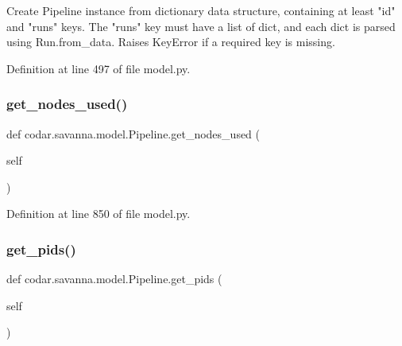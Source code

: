 \begin{DoxyVerb}Create Pipeline instance from dictionary data structure, containing
at least "id" and "runs" keys. The "runs" key must have a list of dict,
and each dict is parsed using Run.from_data.
Raises KeyError if a required key is missing.\end{DoxyVerb}
 

Definition at line 497 of file model.\+py.

\mbox{\label{classcodar_1_1savanna_1_1model_1_1_pipeline_a0c85356d538d06651c7ed18ceb7c1ce5}} 
\subsubsection{\texorpdfstring{get\+\_\+nodes\+\_\+used()}{get\_nodes\_used()}}
{\footnotesize\ttfamily def codar.\+savanna.\+model.\+Pipeline.\+get\+\_\+nodes\+\_\+used (\begin{DoxyParamCaption}\item[{}]{self }\end{DoxyParamCaption})}



Definition at line 850 of file model.\+py.

\mbox{\label{classcodar_1_1savanna_1_1model_1_1_pipeline_a45f720376f4a44a4d87777c572c7dd3c}} 
\subsubsection{\texorpdfstring{get\+\_\+pids()}{get\_pids()}}
{\footnotesize\ttfamily def codar.\+savanna.\+model.\+Pipeline.\+get\+\_\+pids (\begin{DoxyParamCaption}\item[{}]{self }\end{DoxyParamCaption})}



